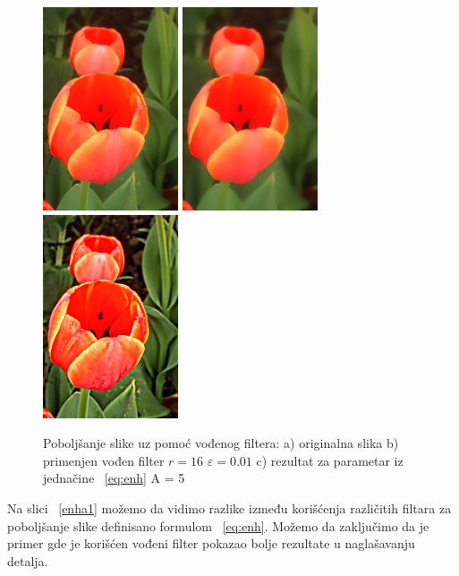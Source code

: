 \documentclass[a4paper,12pt,titlepage]{article}
\begin{document}
\begin{figure}[ht!]
\centering
\includegraphics[width=40mm]{img/flower.png}
\includegraphics[width=40mm]{img/flowerEGF.png}
\includegraphics[width=40mm]{img/flowerER.png}
\caption{Poboljšanje slike uz pomoć vođenog filtera: a) originalna slika b) primenjen vođen filter $r = 16$ $\varepsilon = 0.01$ c) rezultat za parametar iz jednačine ~\ref{eq:enh} A = 5 }
\label{enha}
\end{figure}

Na slici ~\ref{enha1} možemo da vidimo razlike između korišćenja različitih filtara za poboljšanje slike definisano formulom ~\ref{eq:enh}. Možemo da zaključimo da je primer gde je korišćen vođeni filter pokazao bolje rezultate u naglašavanju detalja.
\end{document}
